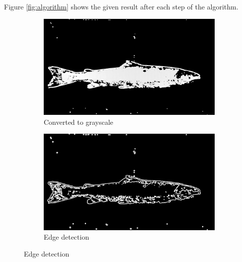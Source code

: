 Figure \ref{fig:algorithm} shows the given result after each step of the algorithm.


\begin{figure}[H]
    \begin{subfigure}{0.49\textwidth}
        \includegraphics[width=\linewidth]{images/implementation/4_1_grayscale}
        \caption{Converted to grayscale} 
        \label{fig:grayscale}
    \end{subfigure}\hspace*{\fill}
    \begin{subfigure}{0.49\textwidth}
        \includegraphics[width=\linewidth]{images/implementation/4_2_edge_detector}
        \caption{Edge detection} 
        \label{fig:edge_detection}
    \end{subfigure}
    

\end{figure}
